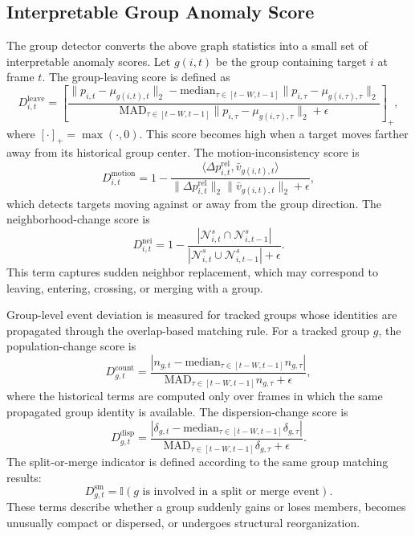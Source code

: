 \subsection{Interpretable Group Anomaly Score}
The group detector converts the above graph statistics into a small set of interpretable anomaly scores. Let \(g(i,t)\) be the group containing target \(i\) at frame \(t\). The group-leaving score is defined as
\begin{equation}
  D_{i,t}^{\mathrm{leave}}
  =
  \left[
  \frac{
  \|p_{i,t}-\mu_{g(i,t),t}\|_2
  -
  \mathrm{median}_{\tau\in[t-W,t-1]}
  \|p_{i,\tau}-\mu_{g(i,\tau),\tau}\|_2
  }
  {
  \mathrm{MAD}_{\tau\in[t-W,t-1]}
  \|p_{i,\tau}-\mu_{g(i,\tau),\tau}\|_2+\epsilon
  }
  \right]_{+},
\end{equation}
where \([\cdot]_+=\max(\cdot,0)\). This score becomes high when a target moves farther away from its historical group center. The motion-inconsistency score is
\begin{equation}
  D_{i,t}^{\mathrm{motion}}
  =
  1-
  \frac{
  \langle \Delta p^{\mathrm{rel}}_{i,t},\bar{v}_{g(i,t),t}\rangle
  }
  {
  \|\Delta p^{\mathrm{rel}}_{i,t}\|_2\|\bar{v}_{g(i,t),t}\|_2+\epsilon
  },
\end{equation}
which detects targets moving against or away from the group direction. The neighborhood-change score is
\begin{equation}
  D_{i,t}^{\mathrm{nei}}
  =
  1-
  \frac{
  |\mathcal{N}_{i,t}^{s}\cap\mathcal{N}_{i,t-1}^{s}|
  }
  {
  |\mathcal{N}_{i,t}^{s}\cup\mathcal{N}_{i,t-1}^{s}|+\epsilon
  }.
\end{equation}
This term captures sudden neighbor replacement, which may correspond to leaving, entering, crossing, or merging with a group.

Group-level event deviation is measured for tracked groups whose identities are propagated through the overlap-based matching rule. For a tracked group \(g\), the population-change score is
\begin{equation}
  D_{g,t}^{\mathrm{count}}
  =
  \frac{
  |n_{g,t}-\mathrm{median}_{\tau\in[t-W,t-1]}n_{g,\tau}|
  }
  {
  \mathrm{MAD}_{\tau\in[t-W,t-1]}n_{g,\tau}+\epsilon
  },
\end{equation}
where the historical terms are computed only over frames in which the same propagated group identity is available. The dispersion-change score is
\begin{equation}
  D_{g,t}^{\mathrm{disp}}
  =
  \frac{
  |\delta_{g,t}-\mathrm{median}_{\tau\in[t-W,t-1]}\delta_{g,\tau}|
  }
  {
  \mathrm{MAD}_{\tau\in[t-W,t-1]}\delta_{g,\tau}+\epsilon
  }.
\end{equation}
The split-or-merge indicator is defined according to the same group matching results:
\begin{equation}
  D_{g,t}^{\mathrm{sm}}=
  \mathbb{I}(g \text{ is involved in a split or merge event}).
\end{equation}
These terms describe whether a group suddenly gains or loses members, becomes unusually compact or dispersed, or undergoes structural reorganization.


